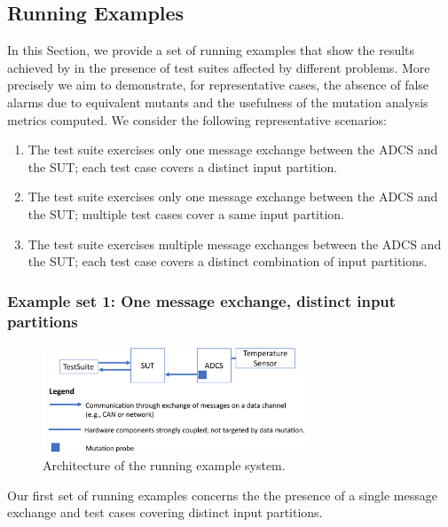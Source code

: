 \clearpage
\subsection{Running Examples}
\label{sec:dataDriven:example}

In this Section, we provide a set of running examples that show the results achieved by \APPR in the presence of test suites affected by different problems. More precisely we aim to demonstrate, for representative cases, the absence of false alarms due to equivalent mutants and the usefulness of the mutation analysis metrics computed. We consider the following representative scenarios:
\begin{enumerate}
\item The test suite exercises only one message exchange between the ADCS and the SUT; each test case covers a distinct input partition.
\item The test suite exercises only one message exchange between the ADCS and the SUT; multiple test cases cover a same input partition.
\item The test suite exercises multiple message exchanges between the ADCS and the SUT; each test case covers a distinct combination of input partitions.
\end{enumerate}


\subsubsection{Example set 1: One message exchange, distinct input partitions}
\label{sec:dataDriven:example:1}

\begin{figure}[tb]
\centering
\includegraphics[width=8cm]{damat/RunningExampleArch}
\caption{Architecture of the running example system.}
\label{fig:damat:RunningExampleArch}
\end{figure}

Our first set of running examples concerns the the presence of a single message exchange and test cases covering distinct input partitions.

